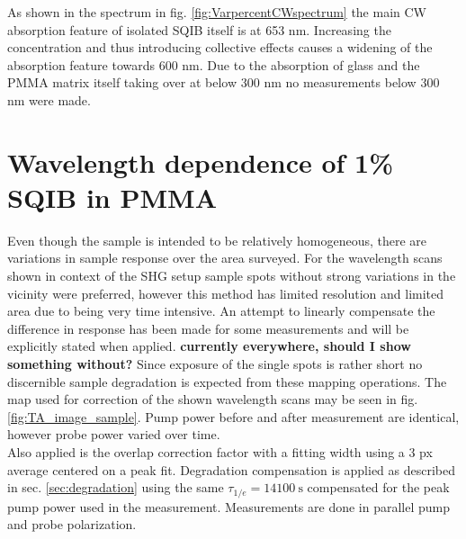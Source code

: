 \documentclass[twoside,openright]{scrreprt}
\begin{document}
As shown in the spectrum in fig. \ref{fig:VarpercentCWspectrum} the main CW absorption feature of isolated SQIB itself is at 653 nm. Increasing the concentration and thus introducing collective effects causes a widening of the absorption feature towards 600 nm. Due to the absorption of glass and the PMMA matrix itself taking over at below 300 nm no measurements below 300 nm were made.\\

\section{Wavelength dependence of 1\% SQIB in PMMA}


Even though the sample is intended to be relatively homogeneous, there are variations in sample response over the area surveyed. For the wavelength scans shown in context of the SHG setup sample spots without strong variations in the vicinity were preferred, however this method has limited resolution and limited area due to being very time intensive. An attempt to linearly compensate the difference in response has been made for some measurements and will be explicitly stated when applied. \textbf{currently everywhere, should I show something without?} Since exposure of the single spots is rather short no discernible sample degradation is expected from these mapping operations. The map used for correction of the shown wavelength scans may be seen in fig. \ref{fig:TA_image_sample}. Pump power before and after measurement are identical, however probe power varied over time.\\
Also applied is the overlap correction factor with a fitting width using a 3 px average centered on a peak fit. Degradation compensation is applied as described in sec. \ref{sec:degradation} using the same $\tau_{1/e} = \SI{14100}{\second}$ compensated for the peak pump power used in the measurement.
Measurements are done in parallel pump and probe polarization.
\end{document}

